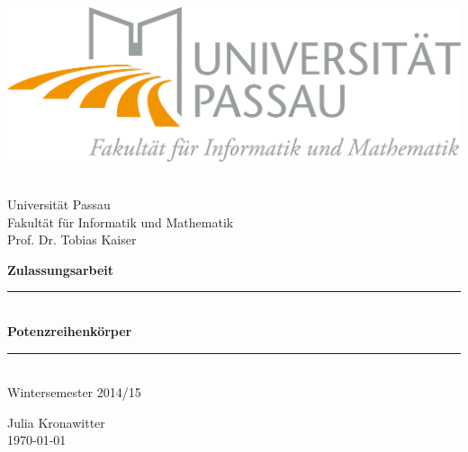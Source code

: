 
\thispagestyle{empty}
%
\begin{center}
\includegraphics[scale=2]{logo.png}
\end{center}
%
\begin{center}
\Large
~\\[0.2cm]
Universität Passau \\
Fakultät für Informatik und Mathematik \\
Prof. Dr. Tobias Kaiser \\
\vspace{50pt}
\end{center}
%
{\huge \centering
\textbf{Zulassungsarbeit}
\vspace{40pt}\\}

%

{\Large\centering
\rule{\textwidth}{3pt}
~\\[0.01cm]
{\fontsize{30pt}{25pt}\selectfont\bfseries Potenzreihenkörper}
~\\[0.01cm]
\rule{\textwidth}{3pt}
~\\[0.4cm]
\Large Wintersemester 2014/15\\
}
\vfill
%
%
%
{\centering
Julia Kronawitter\\[0.3cm]
\today\\}
